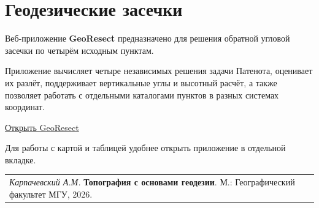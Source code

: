 \documentclass[
  russian,
  letterpaper,
  DIV=11,
  numbers=noendperiod]{scrreprt}
\begin{document}

\chapter{Геодезические
засечки}\label{ux433ux435ux43eux434ux435ux437ux438ux447ux435ux441ux43aux438ux435-ux437ux430ux441ux435ux447ux43aux438}

Веб-приложение \textbf{GeoResect} предназначено для решения обратной
угловой засечки по четырём исходным пунктам.

Приложение вычисляет четыре независимых решения задачи Патенота,
оценивает их разлёт, поддерживает вертикальные углы и высотный расчёт, а
также позволяет работать с отдельными каталогами пунктов в разных
системах координат.

\href{georesect/index.html}{Открыть GeoResect}

Для работы с картой и таблицей удобнее открыть приложение в отдельной
вкладке.

\begin{longtable}[]{@{}l@{}}
\toprule\noalign{}
\endhead
\bottomrule\noalign{}
\endlastfoot
\emph{Карпачевский А.М.} \textbf{Топография с основами геодезии}. М.:
Географический факультет МГУ, 2026. \\
\end{longtable}
\end{document}
